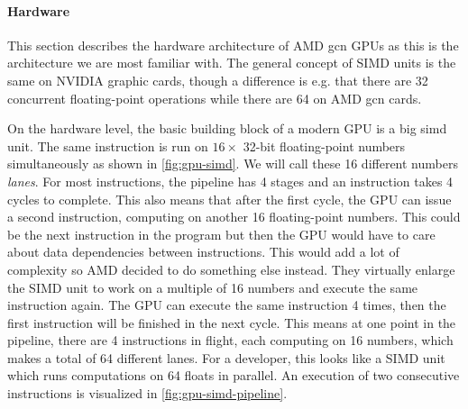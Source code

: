 \paragraph{Hardware} This section describes the hardware architecture of AMD \gls{gcn} GPUs as this is the architecture we are most familiar with. The general concept of SIMD units is the same on NVIDIA graphic cards, though a difference is e.g. that there are 32 concurrent floating-point operations while there are 64 on AMD \gls{gcn} cards.

\begin{figure}
\centering
\begin{minipage}[t]{.5\textwidth}
	\centering
	
\end{minipage}%
\begin{minipage}[t]{.5\textwidth}
	\centering
	
\end{minipage}
\end{figure}
On the hardware level, the basic building block of a modern GPU is a big \gls{simd} unit. The same instruction is run on $16 \times$ 32-bit floating-point numbers simultaneously as shown in \cref{fig:gpu-simd}. We will call these 16 different numbers \emph{lanes}. For most instructions, the pipeline has 4 stages and an instruction takes 4 cycles to complete. This also means that after the first cycle, the GPU can issue a second instruction, computing on another 16 floating-point numbers. This could be the next instruction in the program but then the GPU would have to care about data dependencies between instructions. This would add a lot of complexity so AMD decided to do something else instead. They virtually enlarge the SIMD unit to work on a multiple of 16 numbers and execute the same instruction again. The GPU can execute the same instruction 4 times, then the first instruction will be finished in the next cycle. This means at one point in the pipeline, there are 4 instructions in flight, each computing on 16 numbers, which makes a total of 64 different lanes. For a developer, this looks like a SIMD unit which runs computations on 64 floats in parallel. An execution of two consecutive instructions is visualized in \cref{fig:gpu-simd-pipeline}.

